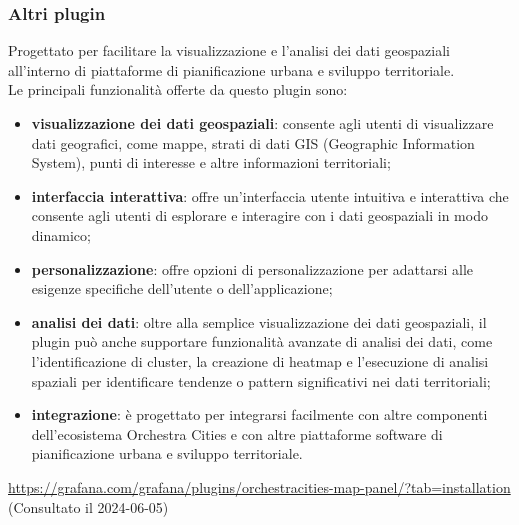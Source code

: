 \subsubsection{Altri plugin}
Progettato per facilitare la visualizzazione e l'analisi dei dati geospaziali all'interno di piattaforme di pianificazione urbana e sviluppo territoriale.\\
Le principali funzionalità offerte da questo plugin sono:
\begin{itemize}
    \item \textbf{visualizzazione dei dati geospaziali}: consente agli utenti di visualizzare dati geografici, come mappe, strati di dati GIS (Geographic Information System), punti di interesse e altre informazioni territoriali;
    \item \textbf{interfaccia interattiva}: offre un'interfaccia utente intuitiva e interattiva che consente agli utenti di esplorare e interagire con i dati geospaziali in modo dinamico;
    \item \textbf{personalizzazione}: offre opzioni di personalizzazione per adattarsi alle esigenze specifiche dell'utente o dell'applicazione;
    \item \textbf{analisi dei dati}: oltre alla semplice visualizzazione dei dati geospaziali, il plugin può anche supportare funzionalità avanzate di analisi dei dati, come l'identificazione di cluster, la creazione di heatmap e l'esecuzione di analisi spaziali per identificare tendenze o pattern significativi nei dati territoriali;
    \item \textbf{integrazione}: è progettato per integrarsi facilmente con altre componenti dell'ecosistema Orchestra Cities e con altre piattaforme software di pianificazione urbana e sviluppo territoriale.
\end{itemize}

\url{https://grafana.com/grafana/plugins/orchestracities-map-panel/?tab=installation} (Consultato il 2024-06-05)

